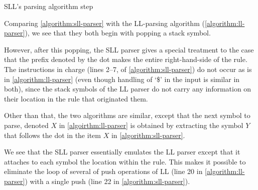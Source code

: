 \begin{algorithm}[h]
  \caption{\label{algorithm:sll-parser}
  SLL's parsing algorithm step}
  \begin{algorithmic}[1]
        \ELSE
        \FI %
      \FI %
      \CONTINUE{}
    \FI
        \CONTINUE{}
      \FI
        \CONTINUE{}
      \FI %
    \FI %
  \end{algorithmic}
\end{algorithm}

Comparing \cref{algorithm:sll-parser} with the LL-parsing algorithm
(\cref{algorithm:ll-parser}), we see that they both begin with popping a stack 
symbol. 

However, after this popping, the SLL parser gives a special treatment to the
case that the prefix denoted by the dot makes the entire right-hand-side of the
rule. The instructions in charge (lines 2--7, of \cref{algorithm:sll-parser})
do not occur as is in \cref{algorithm:ll-parser} (even though handling of `\$'
in the input is similar in both), since the stack symbols of the LL parser do
not carry any information on their location in the rule that originated them. 

Other than that, the two algorithms are similar, except that the next symbol to
parse, denoted $X$ in \cref{algoirthm:ll-parser} is obtained by extracting the
symbol $Y$ that follows the dot in the item $X$ in \cref{algorithm:sll-parser}.

We see that the SLL parser essentially emulates the LL parser except that it
attaches to each symbol the location within the rule. This makes it possible to
eliminate the loop of several of push operations of LL (line 20 in
\cref{algorithm:ll-parser}) with a single push (line 22 in
\cref{algorithm:sll-parser}). 

